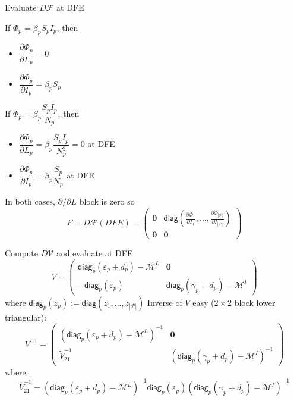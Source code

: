 \documentclass[aspectratio=169]{beamer}\usepackage[]{graphicx}\usepackage[]{xcolor}
\begin{document}
\begin{frame}{Evaluate $D\mathcal{F}$ at DFE}
	\begin{minipage}[t]{0.45\textwidth}
		If $\Phi_p=\beta_pS_pI_p$, then
		\begin{itemize}
			\item $\dfrac{\partial\Phi_p}{\partial L_p}=0$
			\item $\dfrac{\partial\Phi_p}{\partial I_p}=\beta_pS_p$
		\end{itemize}
	\end{minipage}
	\begin{minipage}[t]{0.45\textwidth}
		If $\Phi_p=\beta_p\dfrac{S_pI_p}{N_p}$, then
		\begin{itemize}
			\item $\dfrac{\partial\Phi_p}{\partial L_p}=\beta_p\dfrac{S_pI_p}{N_p^2}=0$ at DFE
			\item $\dfrac{\partial\Phi_p}{\partial I_p}=\beta_p\dfrac{S_p}{N_p}$ at DFE
		\end{itemize}
	\end{minipage}
	\vfill
In both cases, $\partial/\partial L$ block is zero so
$$
F=D\mathcal{F}(DFE)=
\begin{pmatrix}
\mathbf{0} & \mathsf{diag}\left(
\frac{\partial\Phi_1}{\partial I_1},\ldots,\frac{\partial\Phi_{|\mathcal{P}|}}{\partial I_{|\mathcal{P}|}}\right) \\
\mathbf{0} & \mathbf{0}
\end{pmatrix}
$$
\end{frame}

\begin{frame}{Compute $D\mathcal{V}$ and evaluate at DFE}
$$
V=
\begin{pmatrix}
\mathsf{diag}_p(\varepsilon_p+d_p)-\mathcal{M}^L & \mathbf{0} \\
-\mathsf{diag}_p(\varepsilon_p) & \mathsf{diag}_p(\gamma_p+d_p)-\mathcal{M}^I
\end{pmatrix}
$$
where $\mathsf{diag}_p(z_p):=\mathsf{diag}(z_1,\ldots,z_{|\mathcal{P}|})$
\vfill
Inverse of $V$ easy ($2\times 2$ block lower triangular):
$$
V^{-1}
=
\begin{pmatrix}
\left(\mathsf{diag}_p(\varepsilon_p+d_p)-\mathcal{M}^L\right)^{-1} & \mathbf{0} \\
\tilde V_{21}^{-1} & \left(\mathsf{diag}_p(\gamma_p+d_p)-\mathcal{M}^I\right)^{-1}
\end{pmatrix}
$$
where
\[
	\tilde V_{21}^{-1}=
	\left(\mathsf{diag}_p(\varepsilon_p+d_p)-\mathcal{M}^L\right)^{-1}
	\mathsf{diag}_p(\varepsilon_p)
	\left(\mathsf{diag}_p(\gamma_p+d_p)-\mathcal{M}^I\right)^{-1}		
\]
\end{frame}
\end{document}
